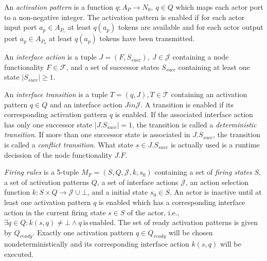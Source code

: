 
\begin{definition}\label{activation-pattern}
An \emph{activation pattern} is a function $q: A_{P} \to N_0,\ q \in Q$
which maps each actor port to a non-negative integer.
The activation pattern is enabled if for each actor input port
$a_{p} \in A_{P_{i}}$ at least $q(a_{p})$ tokens are available
and for each actor output port
$a_{p} \in A_{P_{o}}$ at least $q(a_{p})$ tokens have been
transmitted.
\end{definition}

\begin{definition}\label{interface-action}
An \emph{interface action} is a tuple $J = (F,S_{succ}),\ J \in \mathcal{J}$ containing
a node functionality $F \in \mathcal{F}$, and a set of successor states $S_{succ}$ containing at least
one state $|S_{succ}| \ge 1$.
\end{definition}

\begin{definition}\label{interface-transition}
An \emph{interface transition} is a tuple $T = (q,J), T \in \mathcal{T}$ containing
an activation pattern $q \in Q$ and an interface action $J in \mathcal{J}$.
A transition is enabled if its corresponding activation pattern $q$ is enabled.
If the associated interface action has only one successor state $|J.S_{succ}| = 1$, the
transition is called a \emph{deterministic transition}.
If more than one successor state is associated in $J.S_{succ}$, the
transition is called a \emph{conflict transition}. What state $s \in J.S_{succ}$
is actually used is a runtime decission of the node functionality $J.F$.
\end{definition}

\begin{definition}\label{firing-rules}
\emph{Firing rules} is a 5-tuple $M_{F} = (S, Q, \mathcal{J}, k, s_0)$ containing
a set of \emph{firing states} $S$, a set of activation patterns $Q$,
a set of interface actions $\mathcal{J}$, an action selection function
$k: S \times Q \to \mathcal{J} \cup \bot$,
and a initial state $s_0 \in S$. An actor is inactive until at least
one activation pattern $q$ is enabled which has a corresponding
interface action in the current firing state $s \in S$ of the actor,
i.e., $\exists{q \in Q}: k(s,q) \ne \bot \wedge q\ \mathrm{is\ enabled}$.
The set of ready activation patterns is given by $Q_{ready}$.
Exactly one activation pattern $q \in Q_{ready}$ will be
chosen nondeterministically and its corresponding interface action
$k(s,q)$ will be executed.
\end{definition}

